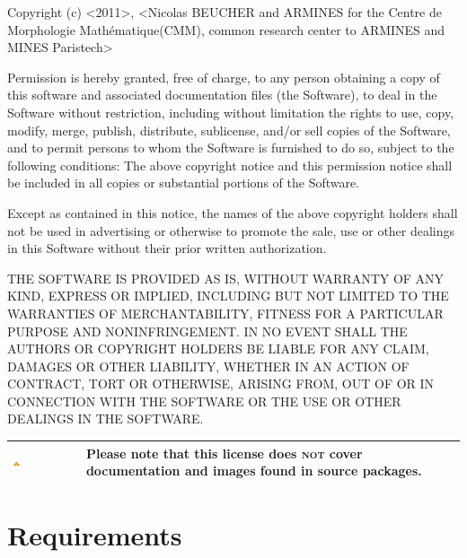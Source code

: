 \documentclass[a4paper,10pt,oneside]{article}
\newenvironment{warnBox}
{
    \begin{center}
    \begin{tabular}{ | b{0.1\textwidth} b{0.8\textwidth} | }
    \hline
    \rowcolor{yellow}
    \includegraphics[width=0.1\textwidth]{Crystal_Clear_app_error.png} &
}
{
    \\
    \hline
    \end{tabular}
    \end{center}
}
\begin{document}
\begin{minipage}[c]{0.8\textwidth}%
 {\small Copyright (c) <2011>, <Nicolas BEUCHER and ARMINES for the Centre de 
 Morphologie Math\'{e}matique(CMM), common research center to ARMINES and MINES 
 Paristech>}{\small \vspace{0.5cm} \par}

{\small Permission is hereby granted, free of charge, to any person
obtaining a copy of this software and associated documentation files
(the \textquotedbl{}Software\textquotedbl{}), to deal in the Software
without restriction, including without limitation the rights to use,
copy, modify, merge, publish, distribute, sublicense, and/or sell
copies of the Software, and to permit persons to whom the Software
is furnished to do so, subject to the following conditions: The above
copyright notice and this permission notice shall be included in all
copies or substantial portions of the Software.}{\small \vspace{0.5cm} \par}

{\small Except as contained in this notice, the names of the above copyright 
holders shall not be used in advertising or otherwise to promote the sale, use 
or other dealings in this Software without their prior written authorization.}
{\small \vspace{0.5cm} \par}

{\small THE SOFTWARE IS PROVIDED \textquotedbl{}AS IS\textquotedbl{},
WITHOUT WARRANTY OF ANY KIND, EXPRESS OR IMPLIED, INCLUDING BUT NOT
LIMITED TO THE WARRANTIES OF MERCHANTABILITY, FITNESS FOR A PARTICULAR
PURPOSE AND NONINFRINGEMENT. IN NO EVENT SHALL THE AUTHORS OR COPYRIGHT
HOLDERS BE LIABLE FOR ANY CLAIM, DAMAGES OR OTHER LIABILITY, WHETHER
IN AN ACTION OF CONTRACT, TORT OR OTHERWISE, ARISING FROM, OUT OF
OR IN CONNECTION WITH THE SOFTWARE OR THE USE OR OTHER DEALINGS IN
THE SOFTWARE. }%
\vspace{1cm}
\end{minipage}

\begin{warnBox}
Please note that this license does \textbf{\textsc{not}} cover documentation and
images found in source packages.
\end{warnBox}

\pagebreak

\section{Requirements}
\label{cha:Requirements}
\end{document}

